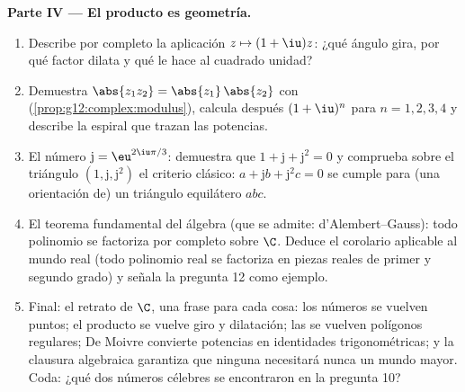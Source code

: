 \begin{problem}
\medskip
\noindent\textbf{Parte IV --- El producto es geometría.}
\begin{enumerate}[resume]
  \item Describe por completo la aplicación $z \mapsto (1 + \iu)z$: ¿qué
        ángulo gira, por qué factor dilata y qué le hace al cuadrado
        unidad?
  \item Demuestra $\abs{z_1 z_2} = \abs{z_1}\,\abs{z_2}$ con 
        (\cref{prop:g12:complex:modulus}), calcula después $(1+\iu)^n$ para
        $n = 1, 2, 3, 4$ y describe la espiral que trazan las potencias.
  \item El número $\mathrm{j} = \eu^{2\iu\pi/3}$: demuestra que
        $1 + \mathrm{j} + \mathrm{j}^2 = 0$ y comprueba sobre el triángulo
        $\left(1, \mathrm{j}, \mathrm{j}^2\right)$ el criterio clásico:
        $a + \mathrm{j} b + \mathrm{j}^2 c = 0$ se cumple para (una
        orientación de) un triángulo equilátero $abc$.
  \item El teorema fundamental del álgebra (que se admite:
        d'Alembert--Gauss): todo polinomio se factoriza por completo sobre
        $\C$. Deduce el corolario aplicable al mundo real (todo polinomio
        real se factoriza en piezas reales de primer y segundo grado) y
        señala la pregunta 12 como ejemplo.
  \item Final: el retrato de $\C$, una frase para cada cosa: los números se
        vuelven puntos; el producto se vuelve giro y dilatación; las  se vuelven polígonos regulares; De Moivre convierte
        potencias en identidades trigonométricas; y la clausura algebraica
        garantiza que ninguna  necesitará nunca un mundo mayor.
        Coda: ¿qué dos números célebres se encontraron en la pregunta 10?
\end{enumerate}
\end{problem}
